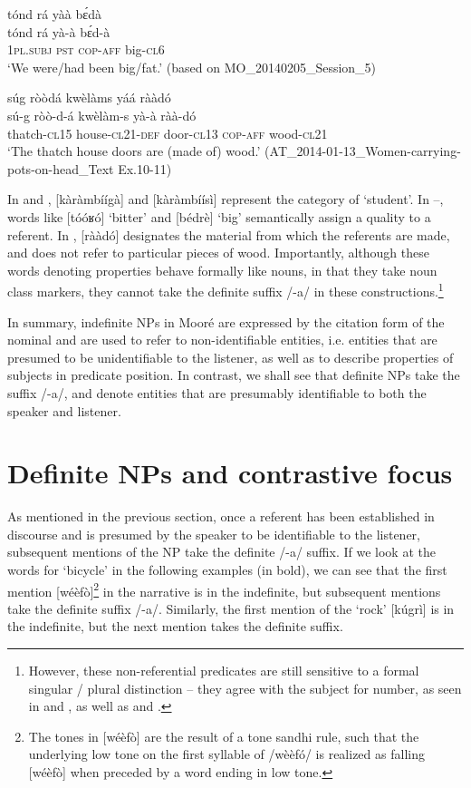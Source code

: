 \documentclass[output=paper]{langsci/langscibook}
\begin{document}
\ea\label{ex:teo:38}
\glll tónd rá yàà b\'ɛdà\\
 tónd rá yà-à b\'ɛd-à\\
\textsc{1pl.subj} \textsc{pst} \textsc{cop-aff} big-\textsc{cl6}\\
\glt ‘We were/had been big/fat.’ (based on MO\_20140205\_Session\_5)
\z

\ea\label{ex:teo:39}
\glll súg ròòdá kwèlàms yáá rààdó\\
 sú-g ròò-d-á kwèlàm-s yà-à ràà-dó\\
thatch-\textsc{cl15} house-\textsc{cl21}-\textsc{def} door-\textsc{cl13} \textsc{cop-aff} wood-\textsc{cl21}\\
\glt ‘The thatch house doors are (made of) wood.’ (AT\_2014-01-13\_Women-carrying-pots-on-head\_Text Ex.10-11)
\z

In  and  , [kàràmbíígà] and [kàràmbíísì] represent the category of ‘student’. In –, words like [tóóʁó] ‘bitter’ and [bédrè] ‘big’ semantically assign a quality to a referent. In , [rààdó] designates the material from which the referents are made, and does not refer to particular pieces of wood. Importantly, although these words denoting properties behave formally like nouns, in that they take noun class markers, they cannot take the definite suffix /-a/ in these constructions.\footnote{However, these non-referential predicates are still sensitive to a formal singular / plural distinction – they agree with the subject for number, as seen in  and , as well as  and .}

In summary, indefinite NPs in Mooré are expressed by the citation form of the nominal and are used to refer to non-identifiable entities, i.e. entities that are presumed to be unidentifiable to the listener, as well as to describe properties of subjects in predicate position. In contrast, we shall see that definite NPs take the suffix /-a/, and denote entities that are presumably identifiable to both the speaker and listener.

\section{Definite NPs and contrastive focus}\label{sec:teo:6}

As mentioned in the previous section, once a referent has been established in discourse and is presumed by the speaker to be identifiable to the listener, subsequent mentions of the NP take the definite /-a/ suffix. If we look at the words for ‘bicycle’ in the following examples (in bold), we can see that the first mention [wéèfò]\footnote{The tones in [wéèfò] are the result of a tone sandhi rule, such that the underlying low tone on the first syllable of /wèèfó/ is realized as falling [wéèfò] when preceded by a word ending in low tone.} in the narrative is in the indefinite, but subsequent mentions take the definite suffix /-a/. Similarly, the first mention of the ‘rock’ [kúgrì] is in the indefinite, but the next mention takes the definite suffix.
\end{document}
